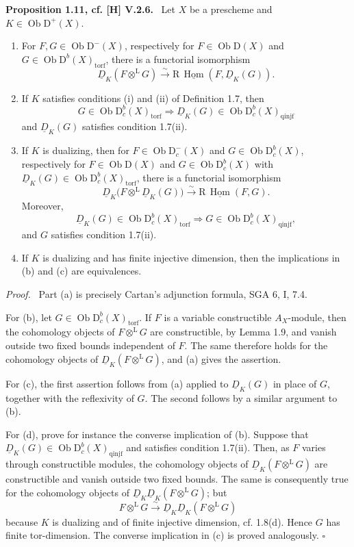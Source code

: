 \documentclass[12pt]{article}
\newcommand{\Hom}{\operatorname{Hom}}
\newcommand{\ob}{\operatorname{Ob}}
\newcommand{\D}{\mathrm D}
\newcommand{\R}{\mathrm R}
\newcommand{\qedtext}{\hfill$\square$}
\newenvironment{statement}[1]{\par\medskip\noindent\textbf{#1.}\ }{\par\medskip}
\newenvironment{prooftext}[1][Proof]{\par\noindent\emph{#1.}\ }{\par\medskip}
\begin{document}
\begin{statement}{Proposition 1.11, cf. [H] V.2.6}
Let $X$ be a prescheme and $K\in\ob\D^+(X)$.
\begin{enumerate}[label=\alph*)]
\item For $F,G\in\ob\D^-(X)$, respectively for $F\in\ob\D(X)$ and $G\in\ob\D^b(X)_{\mathrm{torf}}$, there is a functorial isomorphism
\[
   \underline D_K(F\otimes^{\mathrm L}G)\xrightarrow{\sim}
   \R\,\underline{\Hom}(F,\underline D_K(G)).
\]

\item If $K$ satisfies conditions (i) and (ii) of Definition 1.7, then
\[
   G\in\ob\D_c^b(X)_{\mathrm{torf}}
   \Longrightarrow
   \underline D_K(G)\in\ob\D_c^b(X)_{\mathrm{qinjf}}
\]
and $\underline D_K(G)$ satisfies condition 1.7(ii).

\item If $K$ is dualizing, then for $F\in\ob\D_c^-(X)$ and $G\in\ob\D_c^b(X)$, respectively for $F\in\ob\D(X)$ and $G\in\ob\D_c^b(X)$ with $\underline D_K(G)\in\ob\D_c^b(X)_{\mathrm{torf}}$, there is a functorial isomorphism
\[
   \underline D_K\bigl(F\otimes^{\mathrm L}\underline D_K(G)\bigr)
      \xrightarrow{\sim}\R\,\underline{\Hom}(F,G).
\]
Moreover,
\[
   \underline D_K(G)\in\ob\D_c^b(X)_{\mathrm{torf}}
   \Longrightarrow
   G\in\ob\D_c^b(X)_{\mathrm{qinjf}},
\]
and $G$ satisfies condition 1.7(ii).

\item If $K$ is dualizing and has finite injective dimension, then the implications in (b) and (c) are equivalences.
\end{enumerate}
\end{statement}

\begin{prooftext}
Part (a) is precisely Cartan's adjunction formula, SGA 6, I, 7.4.

For (b), let $G\in\ob\D_c^b(X)_{\mathrm{torf}}$. If $F$ is a variable constructible $A_X$-module, then the cohomology objects of $F\otimes^{\mathrm L}G$ are constructible, by Lemma 1.9, and vanish outside two fixed bounds independent of $F$. The same therefore holds for the cohomology objects of $\underline D_K(F\otimes^{\mathrm L}G)$, and (a) gives the assertion.

For (c), the first assertion follows from (a) applied to $\underline D_K(G)$ in place of $G$, together with the reflexivity of $G$. The second follows by a similar argument to (b).

For (d), prove for instance the converse implication of (b). Suppose that $\underline D_K(G)\in\ob\D_c^b(X)_{\mathrm{qinjf}}$ and satisfies condition 1.7(ii). Then, as $F$ varies through constructible modules, the cohomology objects of $\underline D_K(F\otimes^{\mathrm L}G)$ are constructible and vanish outside two fixed bounds. The same is consequently true for the cohomology objects of $\underline D_K\underline D_K(F\otimes^{\mathrm L}G)$; but
\[
   F\otimes^{\mathrm L}G\xrightarrow{\sim}\underline D_K\underline D_K(F\otimes^{\mathrm L}G)
\]
because $K$ is dualizing and of finite injective dimension, cf. 1.8(d). Hence $G$ has finite tor-dimension. The converse implication in (c) is proved analogously. \qedtext
\end{prooftext}
\end{document}
